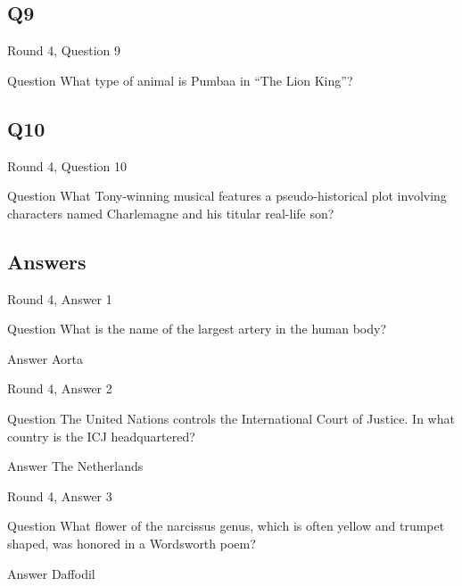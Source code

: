 \documentclass[11pt]{beamer}
\begin{document}
\subsection*{Q9}
\begin{frame}[t]{Round 4, Question 9}
\vspace{2em}
\begin{block}{Question}
What type of animal is Pumbaa in ``The Lion King''\@?
\end{block}
\end{frame}
    

\subsection*{Q10}
\begin{frame}[t]{Round 4, Question 10}
\vspace{2em}
\begin{block}{Question}
What Tony-winning musical features a pseudo-historical plot involving characters named Charlemagne and his titular real-life son\@?
\end{block}
\end{frame}
    
\subsection{Answers}

\begin{frame}[t]{Round 4, Answer 1}
\vspace{2em}
\begin{block}{Question}
What is the name of the largest artery in the human body\@?
\end{block}
\pause{}
\begin{block}{Answer}
Aorta
\end{block}
\end{frame}
    

\begin{frame}[t]{Round 4, Answer 2}
\vspace{2em}
\begin{block}{Question}
The United Nations controls the International Court of Justice. In what country is the ICJ headquartered\@?
\end{block}
\pause{}
\begin{block}{Answer}
The Netherlands
\end{block}
\end{frame}
    

\begin{frame}[t]{Round 4, Answer 3}
\vspace{2em}
\begin{block}{Question}
What flower of the narcissus genus, which is often yellow and trumpet shaped, was honored in a Wordsworth poem\@?
\end{block}
\pause{}
\begin{block}{Answer}
Daffodil
\end{block}
\end{frame}
    
\end{document}
